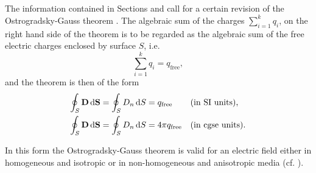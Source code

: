 \subsection{}\label{18.3.3} The information contained in Sections  and  call for a certain revision of the Ostrogradsky-Gauss theorem . The algebraic sum of the charges $\sum_{i=1}^{k} q_{i}$, on the right­ hand side of the theorem is to be regarded as the algebraic
sum of the free electric charges enclosed by surface $S$, i.e. 
\begin{equation*}%
\sum_{i=1}^{k} q_{i} = q_{\text{free}},
\end{equation*}
and the theorem is then of the form 
\begin{align*}
\oint_{S} \vb{D}\, \dd \vb{S} & = \oint_{S} D_{n}\, \dd S =  q_{\text{free}}&& \text{(in SI units),} \\
\oint_{S} \vb{D}\, \dd \vb{S} & = \oint_{S} D_{n}\, \dd S =  4\pi q_{\text{free}}&& \text{(in cgse units).}
\end{align*}

In this form the Ostrogradsky-Gauss theorem is valid for an electric field either in homogeneous and isotropic or in non-homogeneous and anisotropic media (cf. ).

